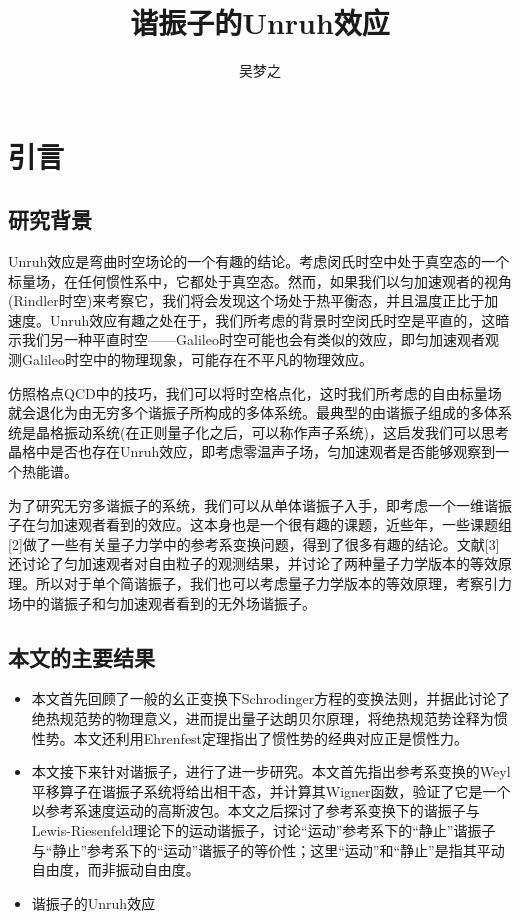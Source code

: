 \documentclass[a4paper]{article}
\title{谐振子的Unruh效应}
\author{吴梦之}
\begin{document}
    \maketitle

    \section{引言}
    \subsection{研究背景}
        Unruh效应是弯曲时空场论的一个有趣的结论。考虑闵氏时空中处于真空态的一个标量场，在任何惯性系中，它都处于真空态。然而，如果我们以匀加速观者的视角(Rindler时空)来考察它，我们将会发现这个场处于热平衡态，并且温度正比于加速度。Unruh效应有趣之处在于，我们所考虑的背景时空闵氏时空是平直的，这暗示我们另一种平直时空——Galileo时空可能也会有类似的效应，即匀加速观者观测Galileo时空中的物理现象，可能存在不平凡的物理效应。

        仿照格点QCD中的技巧，我们可以将时空格点化，这时我们所考虑的自由标量场就会退化为由无穷多个谐振子所构成的多体系统。最典型的由谐振子组成的多体系统是晶格振动系统(在正则量子化之后，可以称作声子系统)，这启发我们可以思考晶格中是否也存在Unruh效应，即考虑零温声子场，匀加速观者是否能够观察到一个热能谱。

        为了研究无穷多谐振子的系统，我们可以从单体谐振子入手，即考虑一个一维谐振子在匀加速观者看到的效应。这本身也是一个很有趣的课题，近些年，一些课题组[2]做了一些有关量子力学中的参考系变换问题，得到了很多有趣的结论。文献[3]还讨论了匀加速观者对自由粒子的观测结果，并讨论了两种量子力学版本的等效原理。所以对于单个简谐振子，我们也可以考虑量子力学版本的等效原理，考察引力场中的谐振子和匀加速观者看到的无外场谐振子。

    \subsection{本文的主要结果}    

        \begin{itemize}
            \item 本文首先回顾了一般的幺正变换下Schrodinger方程的变换法则，并据此讨论了绝热规范势的物理意义，进而提出量子达朗贝尔原理，将绝热规范势诠释为惯性势。本文还利用Ehrenfest定理指出了惯性势的经典对应正是惯性力。
            \item 本文接下来针对谐振子，进行了进一步研究。本文首先指出参考系变换的Weyl平移算子在谐振子系统将给出相干态，并计算其Wigner函数，验证了它是一个以参考系速度运动的高斯波包。本文之后探讨了参考系变换下的谐振子与Lewis-Riesenfeld理论下的运动谐振子，讨论“运动”参考系下的“静止”谐振子与“静止”参考系下的“运动”谐振子的等价性；这里“运动”和“静止”是指其平动自由度，而非振动自由度。
            \item 谐振子的Unruh效应
        \end{itemize}
\end{document}
